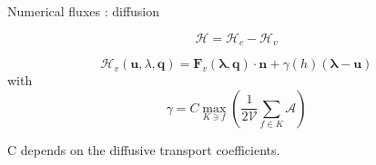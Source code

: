 \documentclass[24pt,t,table, aspectratio=169]{beamer}
\newcommand{\vecu}{\mathbf{u}}
\newcommand{\vecF}{\mathbf{F}}
\newcommand{\vecq}{\mathbf{q}}
\newcommand{\vecHcal}{\boldsymbol{\mathcal{H}}}
\newcommand{\veclambda}{\boldsymbol{\lambda}}
\begin{document}
\begin{frame}{Numerical fluxes : diffusion}

\begin{framed}
\begin{equation*}
\vecHcal = \vecHcal_c - \vecHcal_v
\end{equation*}
\end{framed}

\begin{equation*}
	\vecHcal_v(\vecu, \lambda, \vecq) = \vecF_v(\veclambda, \vecq) \cdot \mathbf{n} + \gamma(h) (\veclambda - \vecu)
\end{equation*}
with 
\begin{equation*}
	\gamma = C \max_{K \ni f}\left(\frac{1}{2\mathcal{V}} \sum_{f\in K} \mathcal{A}\right) 
\end{equation*}

C depends on the diffusive transport coefficients.

\end{frame}
\end{document}
